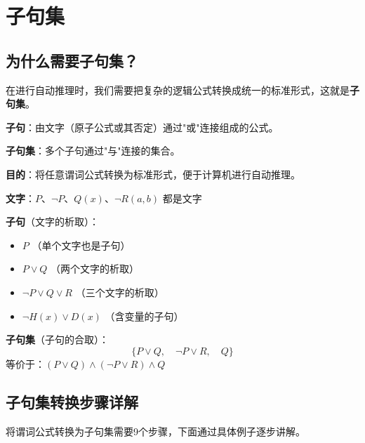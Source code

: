 \section{子句集}

\subsection{为什么需要子句集？}

在进行自动推理时，我们需要把复杂的逻辑公式转换成统一的标准形式，这就是\textbf{子句集}。

\begin{conceptbox}
\textbf{子句}：由文字（原子公式或其否定）通过"或"连接组成的公式。

\textbf{子句集}：多个子句通过"与"连接的集合。

\textbf{目的}：将任意谓词公式转换为标准形式，便于计算机进行自动推理。
\end{conceptbox}

\begin{examplebox}[例子：什么是子句？]
\textbf{文字}：$P$、$\neg P$、$Q(x)$、$\neg R(a,b)$ 都是文字

\textbf{子句}（文字的析取）：
\begin{itemize}[itemsep=0pt]
    \item $P$ （单个文字也是子句）
    \item $P \lor Q$ （两个文字的析取）
    \item $\neg P \lor Q \lor R$ （三个文字的析取）
    \item $\neg H(x) \lor D(x)$ （含变量的子句）
\end{itemize}

\textbf{子句集}（子句的合取）：
$$\{P \lor Q, \quad \neg P \lor R, \quad Q\}$$
等价于：$(P \lor Q) \land (\neg P \lor R) \land Q$
\end{examplebox}

\subsection{子句集转换步骤详解}

将谓词公式转换为子句集需要9个步骤，下面通过具体例子逐步讲解。

